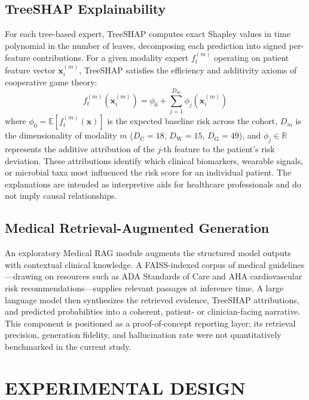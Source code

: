 \documentclass[10pt,twocolumn,letterpaper]{article}
\begin{document}
\subsection{TreeSHAP Explainability}
For each tree-based expert, TreeSHAP \citep{lundberg2017unified} computes exact Shapley values in time polynomial in the number of leaves, decomposing each prediction into signed per-feature contributions. For a given modality expert $f_t^{(m)}$ operating on patient feature vector $\mathbf{x}_i^{(m)}$, TreeSHAP satisfies the efficiency and additivity axioms of cooperative game theory:
\begin{equation}
\label{eq:treeshap}
f_t^{(m)}\left(\mathbf{x}_i^{(m)}\right) = \phi_0 + \sum_{j=1}^{D_m} \phi_j\left(\mathbf{x}_i^{(m)}\right)
\end{equation}
where $\phi_0 = \mathbb{E}[f_t^{(m)}(\mathbf{x})]$ is the expected baseline risk across the cohort, $D_m$ is the dimensionality of modality $m$ ($D_{\text{C}}=18$, $D_{\text{W}}=15$, $D_{\text{G}}=49$), and $\phi_j \in \mathbb{R}$ represents the additive attribution of the $j$-th feature to the patient's risk deviation. These attributions identify which clinical biomarkers, wearable signals, or microbial taxa most influenced the risk score for an individual patient. The explanations are intended as interpretive aids for healthcare professionals and do not imply causal relationships.

\subsection{Medical Retrieval-Augmented Generation}
An exploratory Medical RAG module augments the structured model outputs with contextual clinical knowledge. A FAISS-indexed corpus of medical guidelines---drawing on resources such as ADA Standards of Care and AHA cardiovascular risk recommendations---supplies relevant passages at inference time. A large language model then synthesizes the retrieved evidence, TreeSHAP attributions, and predicted probabilities into a coherent, patient- or clinician-facing narrative. This component is positioned as a proof-of-concept reporting layer; its retrieval precision, generation fidelity, and hallucination rate were not quantitatively benchmarked in the current study.

\section{EXPERIMENTAL DESIGN}
\end{document}
